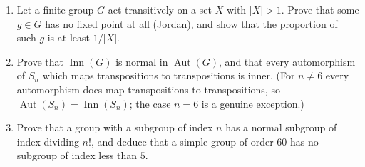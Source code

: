 \documentclass[11pt,a4paper]{article}
\DeclareMathOperator{\Aut}{Aut}
\DeclareMathOperator{\Inn}{Inn}
\begin{document}
\begin{enumerate}[leftmargin=2.2em,itemsep=0.6em]
\item Let a finite group $G$ act transitively on a set $X$ with $|X|>1$. Prove that some
$g\in G$ has no fixed point at all (Jordan), and show that the proportion of such $g$ is at
least $1/|X|$.

\item Prove that $\Inn(G)$ is normal in $\Aut(G)$, and that every automorphism of $S_n$ which
maps transpositions to transpositions is inner. (For $n\ne6$ every automorphism does map
transpositions to transpositions, so $\Aut(S_n)=\Inn(S_n)$; the case $n=6$ is a genuine
exception.)

\item Prove that a group with a subgroup of index $n$ has a normal subgroup of index dividing
$n!$, and deduce that a simple group of order $60$ has no subgroup of index less than $5$.
\end{enumerate}
\end{document}
